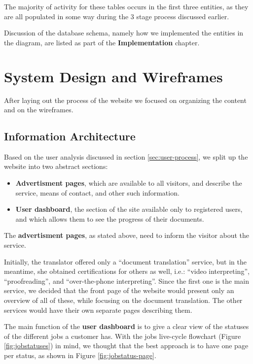 \documentclass{l3proj}
\begin{document}
The majority of activity for these tables occurs in the first three entities, as they are all populated 
in some way during the 3 stage process discussed earlier.

Discussion of the database schema, namely how we implemented the entities in the diagram, are listed as part of the \textbf{Implementation} chapter.


\section{System Design and Wireframes}
\label{sec:system-design-and-wireframes}
After laying out the process of the website we focused on organizing the content
and on the wireframes.


\subsection{Information Architecture}
Based on the user analysis discussed in section \ref{sec:user-process}, we split
up the website into two abstract sections: 
\begin{itemize} 
	\item \textbf{Advertisment pages}, which are available to all visitors, and
	describe the service, means of contact, and other such information.
	\item \textbf{User dashboard}, the section of the site available only to
	registered users, and which allows them to see the progress of their 
	documents.
\end{itemize}

The \textbf{advertisment pages}, as stated above, need to inform the visitor
about the service. 

Initially, the translator offered only a ``document translation'' service, but
in the meantime, she obtained certifications for others as well, i.e.:
``video interpreting'', ``proofreading'', and ``over-the-phone interpreting''.
Since the first one is the main service, we decided that the front page of the
website would present only an overview of all of these, while focusing on the
document translation. The other services would have their own separate pages
describing them.

The main function of the \textbf{user dashboard} is to give a clear view of
the statuses of the different jobs a customer has. With the jobs live-cycle
flowchart (Figure \ref{fig:jobstatuses}) in mind, we thought that the best
approach is to have one page per status, as shown in Figure 
\ref{fig:jobstatus-page}.
\end{document}
